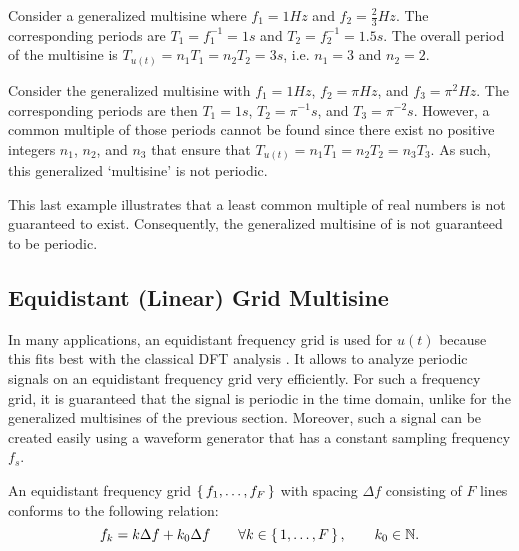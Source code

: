   \begin{example}
   Consider a generalized multisine where $f_1 = 1 \unit{Hz}$ and $f_2 = \tfrac{2}{3} \unit{Hz}$.
   The corresponding periods are $T_1 = f_1^{-1} = 1 \unit{s}$ and $T_2 = f_2^{-1} = 1.5 \unit{s}$.
   The overall period of the multisine is $T_{u(t)} = n_1 T_1 = n_2 T_2 = 3 \unit{s}$, i.e. $n_1 = 3$ and $n_2=2$.
  \end{example}

  \begin{example}\label{eg:excitation:non-periodic}
   Consider the generalized multisine with $f_1 = 1 \unit{Hz}$, $f_2 = \pi \unit{Hz}$, and $f_3 = \pi^2 \unit{Hz}$.
   The corresponding periods are then $T_1 = 1 \unit{s}$, $T_2 = \pi^{-1} \unit{s}$, and $T_3 = \pi^{-2} \unit{s}$.
   However, a common multiple of those periods cannot be found since there exist no positive integers $n_1$, $n_2$, and $n_3$ that ensure that $T_{u(t)} = n_1 T_1 = n_2 T_2 = n_3 T_3$.
   As such, this generalized `multisine' is not periodic.
  \end{example}

  This last example illustrates that a least common multiple of real numbers is not guaranteed to exist.
  Consequently, the generalized multisine of  is not guaranteed to be periodic.
  
\subsection{Equidistant (Linear) Grid Multisine}
  In many applications, an equidistant frequency grid is used for $u\left( t\right) $ because this fits best with the classical \gls{DFT} analysis \citep{OppenheimDT,Mandal2007}.
  It allows to analyze periodic signals on an equidistant frequency grid very efficiently.
  For such a frequency grid, it is guaranteed that the signal is periodic in the time domain, unlike for the generalized multisines of the previous section.
  Moreover, such a signal can be created easily using a waveform generator that has a constant sampling frequency $f_s$.
  
  An equidistant frequency grid $\set{f_1, \ldots, f_F}$ with spacing $\Delta f$
  consisting of $F$ lines conforms to the following relation:
  \begin{equation}
    f_k = k \Delta f + k_0 \Delta f
    \qquad \forall k \in \set{1,\ldots,F},
    \qquad k_0 \in \mathbb{N}
    \text{.}
  \label{eq:excitation:linGrid}
  \end{equation}
  
